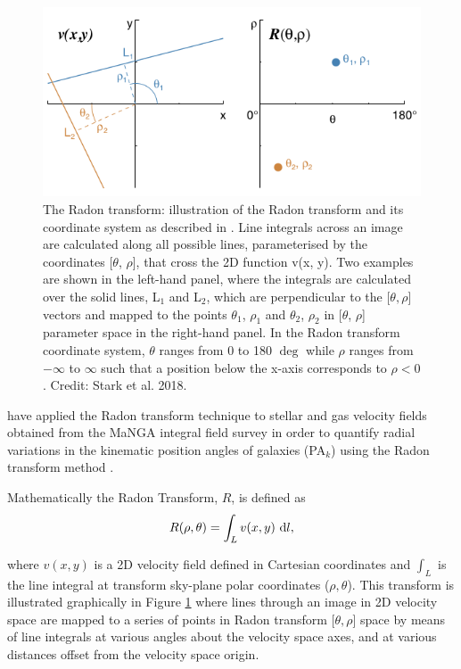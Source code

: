 \begin{figure}
    \centering
    \includegraphics[width=\columnwidth]{images/RadonPlots/Radon-transform-Stark.png}
    \caption{The Radon transform: illustration of the Radon transform and its coordinate system as described in \citet{2018MNRAS.480.2217S}. Line integrals across an image are calculated along all possible lines, parameterised by the coordinates [$\theta$, $\rho$], that cross the 2D function v(x, y). Two examples are shown in the left-hand panel, where the integrals are calculated over the solid lines, L$_1$ and L$_2$, which are perpendicular to the [$\theta, \rho$] vectors and mapped to the points $\theta_1$, $\rho_1$ and $\theta_2$, $\rho_2$ in [$\theta$, $\rho$] parameter space in the right-hand panel. In the Radon transform coordinate system, $\theta$ ranges from 0 to 180 $\deg$ while $\rho$ ranges from $-\infty$ to $\infty$ such that a position below the x-axis corresponds to $\rho < 0$. Credit: Stark et al. 2018.}
    \label{fig:RadonTransform}
\end{figure}

\citet{2018MNRAS.480.2217S} have applied the Radon transform technique to stellar and gas velocity fields obtained from the MaNGA integral field survey in order to quantify radial variations in the kinematic position angles of galaxies (PA$_k$) using the Radon transform method \citep[see e.g.][]{radon1917determination, 7910dc8d5b654c90ac4bc94c67d06f01}. 

Mathematically the Radon Transform, $R$, is defined as
\begin{equation}
    \label{eqn:radon}
    R(\rho,\theta)=\int_{L}{v(x,y)\, \mathop{}\!\mathrm{d} l},
\end{equation}

where $v(x,y)$ is a 2D velocity field defined in Cartesian coordinates and $\int_{L}$ is the line integral at transform sky-plane polar coordinates ($\rho,\theta$). This transform is illustrated graphically in Figure \ref{fig:RadonTransform} where lines through an image in 2D velocity space are mapped to a series of points in Radon transform [$\theta,\rho$] space by means of line integrals at various angles about the velocity space axes, and at various distances offset from the velocity space origin. 



